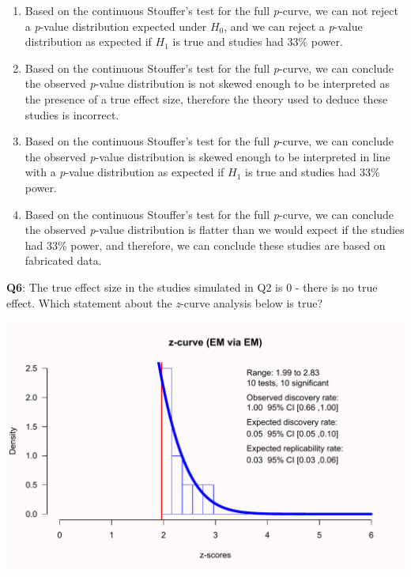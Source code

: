 \documentclass[
  oneside]{book}
\providecommand{\tightlist}{%
  \setlength{\itemsep}{0pt}\setlength{\parskip}{0pt}}
\begin{document}
\begin{enumerate}
\def\labelenumi{\Alph{enumi})}
\tightlist
\item
  Based on the continuous Stouffer's test for the full \emph{p}-curve, we can not reject a \emph{p}-value distribution expected under \(H_0\), and we can reject a \emph{p}-value distribution as expected if \(H_1\) is true and studies had 33\% power.
\item
  Based on the continuous Stouffer's test for the full \emph{p}-curve, we can
  conclude the observed \emph{p}-value distribution is not skewed enough to be
  interpreted as the presence of a true effect size, therefore the theory used to deduce these studies is incorrect.
\item
  Based on the continuous Stouffer's test for the full \emph{p}-curve, we can
  conclude the observed \emph{p}-value distribution is skewed enough to be
  interpreted in line with a \emph{p}-value distribution as expected if \(H_1\) is true and studies had 33\% power.
\item
  Based on the continuous Stouffer's test for the full \emph{p}-curve, we can
  conclude the observed \emph{p}-value distribution is flatter than we
  would expect if the studies had 33\% power, and therefore, we can conclude these studies are based on fabricated data.
\end{enumerate}

\textbf{Q6}: The true effect size in the studies simulated in Q2 is 0 - there is no true effect. Which statement about the \emph{z}-curve analysis below is true?

\begin{center}\includegraphics[width=1\linewidth]{12-bias_files/figure-latex/zcurveq6-1} \end{center}
\end{document}

